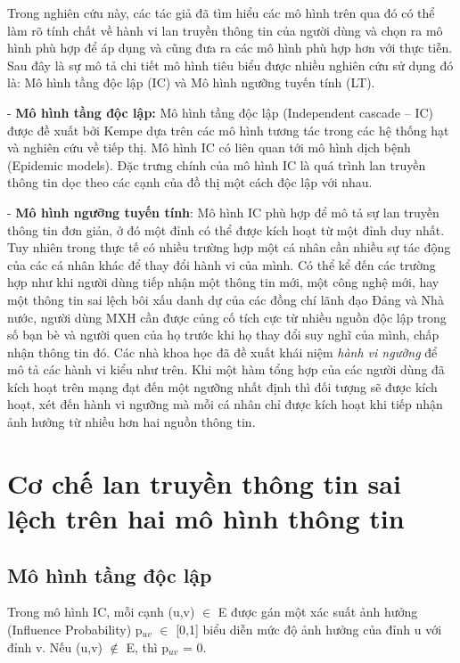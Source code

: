 Trong nghiên cứu này, các tác giả đã tìm hiểu các mô hình trên qua đó có thể làm rõ tính chất về hành vi lan truyền thông tin của người dùng và chọn ra mô hình phù hợp để áp dụng và cũng đưa ra các mô hình phù hợp hơn với thực tiễn. Sau đây là sự mô tả chi tiết mô hình tiêu biểu được nhiều nghiên cứu sử dụng đó là: Mô hình tầng độc lập (IC) và Mô hình ngưỡng tuyến tính (LT).

- {\bfseries Mô hình tầng độc lập:} Mô hình tầng độc lập (Independent cascade – IC) được đề xuất bởi Kempe \cite{kemple1} dựa trên các mô hình tương tác trong các hệ thống hạt và nghiên cứu về tiếp thị. Mô hình IC có liên quan tới mô hình dịch bệnh (Epidemic models). Đặc trưng chính của mô hình IC là quá trình lan truyền thông tin dọc theo các cạnh của đồ thị một cách độc lập với nhau.
	
- {\bfseries Mô hình ngưỡng tuyến tính}: Mô hình IC phù hợp để mô tả sự lan truyền thông tin đơn giản, ở đó một đỉnh có thể được kích hoạt từ một đỉnh duy nhất. Tuy nhiên trong thực tế có nhiều trường hợp một cá nhân cần nhiều sự tác động của các cá nhân khác để thay đổi hành vi của mình. Có thể kể đến các trường hợp như khi người dùng tiếp nhận một thông tin mới, một công nghệ mới, hay một thông tin sai lệch bôi xấu danh dự của các đồng chí lãnh đạo Đảng và Nhà nước, người dùng MXH cần được củng cố tích cực từ nhiều nguồn độc lập trong số bạn bè và người quen của họ trước khi họ thay đổi suy nghĩ của mình, chấp nhận thông tin đó. Các nhà khoa học đã đề xuất khái niệm {\itshape hành vi ngưỡng} để mô tả các hành vi kiểu như trên. Khi một hàm tổng hợp của các người dùng đã kích hoạt trên mạng đạt đến một ngưỡng nhất định thì  đối tượng sẽ được kích hoạt, xét đến hành vi ngưỡng mà mỗi cá nhân chỉ được kích hoạt khi tiếp nhận ảnh hưởng từ nhiều hơn hai nguồn thông tin.

\section{Cơ chế lan truyền thông tin sai lệch trên hai mô hình thông tin}
	\subsection{Mô hình tầng độc lập} 
	Trong mô hình IC, mỗi cạnh (u,v) $\in$ E được gán một xác suất ảnh hưởng (Influence Probability) p$_{uv}$ $\in$ [0,1] biểu diễn mức độ ảnh hưởng của đỉnh u với đỉnh v. Nếu (u,v) $\notin$ E, thì p$_{uv}$ = 0.
	
